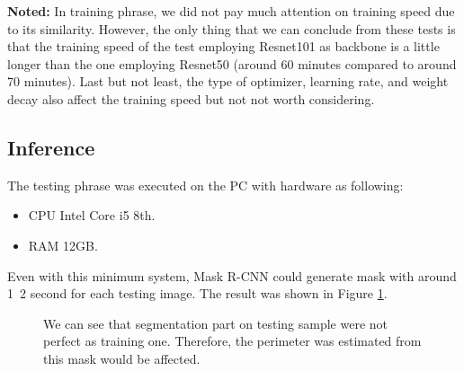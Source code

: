 	\textbf{Noted:} In training phrase, we did not pay much attention on training speed due to its similarity. However, the only thing that we can conclude from these tests is that the training speed of the test employing Resnet101 as backbone is a little longer than the one employing Resnet50 (around 60 minutes compared to around 70 minutes). Last but not least, the type of optimizer, learning rate, and weight decay also affect the training speed but not not worth considering.
	
\subsection{Inference}
\label{subsection:mrcnn_inference}
\noindent
	
	The testing phrase was executed on the PC with hardware as following:
	
	\begin{itemize}
		\item CPU Intel Core i5 8th.
		\item RAM 12GB.
	\end{itemize}
	
	Even with this minimum system, Mask R-CNN could generate mask with around 1~2 second for each testing image. The result was shown in Figure \ref{fig:train_test_result}.
	
	\begin{figure}[H]
		\centering
		\hfill %
		\hfill %
		\caption{We can see that segmentation part on testing sample were not perfect as training one. Therefore, the perimeter was estimated from this mask would be affected.}
		\label{fig:train_test_result}
	\end{figure}
	
